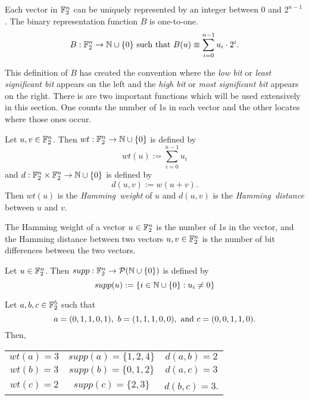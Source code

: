 \par Each vector in $\mathbb{F}_2^n$ can be uniquely represented by an integer between
$0$ and $2^{n-1}$. The binary representation function $B$ is one-to-one.
\begin{equation}
	B:\gftwo^n\rightarrow\nnn\cup\{0\}\ {\rm such\ that }\ B(u)\equiv \sum_{i=0}^{n-1}u_i\cdot2^i.
\end{equation}

\par This definition of $B$ has created the convention where the {\em low bit} or
{\em least significant bit} appears on the left and the {\em high bit} or {\em most significant bit}
appears on the right. There is are two important functions which will be used extensively in this
section. One counts the number of 1s in each vector and the other locates where those ones occur.

\begin{definition}
\label{def:Hamming}
	Let $u,v\in\mathbb{F}_2^n$. Then $wt:\mathbb{F}_2^n\rightarrow\mathbb{N}\cup\{0\}$ is defined by
	\[
	  wt(u):=\sum_{i=0}^{n-1}u_i
	\]
	and $d:\mathbb{F}_2^n\times\mathbb{F}_2^n\rightarrow\mathbb{N}\cup\{0\}$ is defined by
	\[
	  d(u,v):=w(u+v).
	\]
	Then $wt(u)$ is the {\em Hamming\ weight} of $u$ and $d(u,v)$ is the
	{\em Hamming\ distance} between $u$ and $v$.
\end{definition}

\begin{remark}
	The Hamming weight of a vector $u\in\mathbb{F}_2^n$ is the number of 1s in the vector, and the
	Hamming distance between two vectors $u,v\in\mathbb{F}_2^n$ is the number of bit differences
	between the two vectors.
\end{remark}

\begin{definition}
\label{def:support}
	Let $u\in\mathbb{F}_2^n$. Then $supp:\mathbb{F}_2^n\rightarrow\mathcal{P}(\mathbb{N}\cup\{0\})$ is defined by
	\[
		supp(u):=\{i\in\mathbb{N}\cup\{0\}:u_i\not=0\}
	\]
\end{definition}

\begin{example}
	Let $a,b,c\in\mathbb{F}_2^5$ such that
	\[
	a=(0,1,1,0,1),\ b=(1,1,1,0,0),\ {\rm and}\ c=(0,0,1,1,0).
	\]
	Then,
	\begin{center}
		\begin{tabular}{c c c}
			$wt(a)=3$&$supp(a)=\{1,2,4\}$&$d(a,b)=2$\\
			$wt(b)=3$&$supp(b)=\{0,1,2\}$&$d(a,c)=3$\\
			$wt(c)=2$&$ supp(c)=\{2,3\}$ &$d(b,c)=3$.\\
		\end{tabular}
	\end{center}
\end{example}

